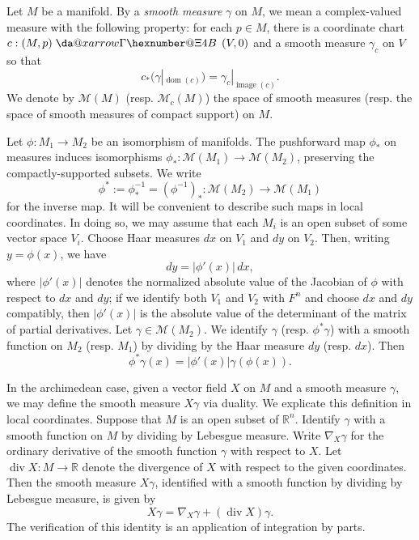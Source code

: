 \documentclass[reqno]{amsart}
\makeatletter
\newcommand*{\da@rightarrow}{\mathchar"0\hexnumber@\symAMSa 4B }
\newcommand*{\xdashrightarrow}[2][]{%
  \mathrel{%
    \mathpalette{\da@xarrow{#1}{#2}{}\da@rightarrow{\,}{}}{}%
  }%
}
\newcommand*{\da@xarrow}[7]{%
  \sbox0{$\ifx#7\scriptstyle\scriptscriptstyle\else\scriptstyle\fi#5#1#6\m@th$}%
  \sbox2{$\ifx#7\scriptstyle\scriptscriptstyle\else\scriptstyle\fi#5#2#6\m@th$}%
  \sbox4{$#7\dabar@\m@th$}%
  \dimen@=\wd0 %
  \ifdim\wd2 >\dimen@
    \dimen@=\wd2 %
  \fi
  \count@=2 %
  \def\da@bars{\dabar@\dabar@}%
  \@whiledim\count@\wd4<\dimen@\do{%
    \advance\count@\@ne
    \expandafter\def\expandafter\da@bars\expandafter{%
      \da@bars
      \dabar@ 
    }%
  }%
  \mathrel{#3}%
  \mathrel{%
    \mathop{\da@bars}\limits
    \ifx\\#1\\%
    \else
      _{\copy0}%
    \fi
    \ifx\\#2\\%
    \else
      ^{\copy2}%
    \fi
  }%
  \mathrel{#4}%
}
\DeclareMathOperator{\image}{image}
\def\div{\operatorname{div}}
\DeclareMathOperator{\dom}{dom}
\theoremstyle{plain} \newtheorem{theorem} {Theorem}
\theoremstyle{definition} \newtheorem{definition} [theorem] {Definition}
\theoremstyle{itplain} %
\numberwithin{equation}{section}
\numberwithin{theorem}{section}
\makeatother
\begin{document}
Let $M$ be a manifold.  By a \emph{smooth measure} $\gamma$ on $M$, we mean a complex-valued measure with the following property: for each $p \in M$, there is a coordinate chart $c : (M,p) \xdashrightarrow{} (V, 0)$ and a smooth measure $\gamma_c$ on $V$ so that
\begin{equation*}
  c_*(\gamma|_{\dom(c)}) = \gamma_c |_{\image(c)}.
\end{equation*}
We denote by $\mathcal{M}(M)$ (resp. $\mathcal{M}_c(M)$) the space of smooth measures (resp. the space of smooth measures of compact support) on $M$.

Let $\phi : M_1 \rightarrow M_2$ be an isomorphism of manifolds.  The pushforward map $\phi_*$ on measures induces isomorphisms $\phi_* : \mathcal{M}(M_1) \rightarrow \mathcal{M}(M_2)$, preserving the compactly-supported subsets.  We write
\begin{equation*}
  \phi^* := \phi_*^{-1} = (\phi^{-1})_* : \mathcal{M}(M_2) \rightarrow \mathcal{M}(M_1)
\end{equation*}
for the inverse map.  It will be convenient to describe such maps in local coordinates.  In doing so, we may assume that each $M_i$ is an open subset of some vector space $V_i$.  Choose Haar measures $d x$ on $V_1$ and $d y$ on $V_2$.  Then, writing $y = \phi(x)$, we have
\begin{equation*}
  d y = |\phi '(x)| \, d x,
\end{equation*}
where $|\phi '(x)|$ denotes the normalized absolute value of the Jacobian of $\phi$ with respect to $d x$ and $d y$; if we identify both $V_1$ and $V_2$ with $F^n$ and choose $d x$ and $d y$ compatibly, then $|\phi '(x)|$ is the absolute value of the determinant of the matrix of partial derivatives.  Let $\gamma \in \mathcal{M}(M_2)$.  We identify $\gamma$ (resp. $\phi^* \gamma$) with a smooth function on $M_2$ (resp. $M_1$) by dividing by the Haar measure $d y$ (resp. $d x$).  Then
\begin{equation}\label{eq:phi-gammax-=jacobian}
  \phi^* \gamma(x) = |\phi '(x)| \gamma(\phi(x)).
\end{equation}

In the archimedean case, given a vector field $X$ on $M$ and a smooth measure $\gamma$, we may define the smooth measure $X \gamma$ via duality.  We explicate this definition in local coordinates.  Suppose that $M$ is an open subset of $\mathbb{R}^n$.  Identify $\gamma$ with a smooth function on $M$ by dividing by Lebesgue measure.  Write $\nabla_X \gamma$ for the ordinary derivative of the smooth function $\gamma$ with respect to $X$.  Let $\div X : M \rightarrow \mathbb{R}$ denote the divergence of $X$ with respect to the given coordinates.  Then the smooth measure $X \gamma$, identified with a smooth function by dividing by Lebesgue measure, is given by
\begin{equation*}
  X \gamma = \nabla_X \gamma + (\div X) \gamma.
\end{equation*}
The verification of this identity is an application of integration by parts.
\end{document}
